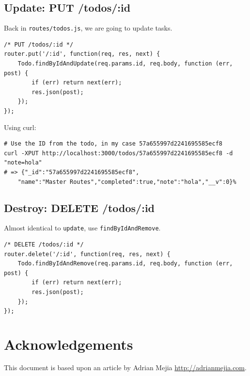 \documentclass[12pt]{article}
\begin{document}
\subsection{Update: PUT /todos/:id}

Back in \texttt{routes/todos.js}, we are going to update tasks. 
\begin{Verbatim}
/* PUT /todos/:id */
router.put('/:id', function(req, res, next) {  
	Todo.findByIdAndUpdate(req.params.id, req.body, function (err, post) {    
		if (err) return next(err);    
		res.json(post);  
	});
});
\end{Verbatim}
Using curl:
\begin{Verbatim}
# Use the ID from the todo, in my case 57a655997d2241695585ecf8
curl -XPUT http://localhost:3000/todos/57a655997d2241695585ecf8 -d "note=hola"
# => {"_id":"57a655997d2241695585ecf8",
	"name":"Master Routes","completed":true,"note":"hola","__v":0}%
\end{Verbatim}

\subsection{Destroy: DELETE /todos/:id}

Almost identical to \texttt{update}, use
\texttt{findByIdAndRemove}.
\begin{Verbatim}
/* DELETE /todos/:id */
router.delete('/:id', function(req, res, next) {  
	Todo.findByIdAndRemove(req.params.id, req.body, function (err, post) {    
		if (err) return next(err);    
		res.json(post);  
	});
});
\end{Verbatim}

\section*{Acknowledgements}

This document is based upon an article by Adrian Mejia \url{http://adrianmejia.com}.
\end{document}
